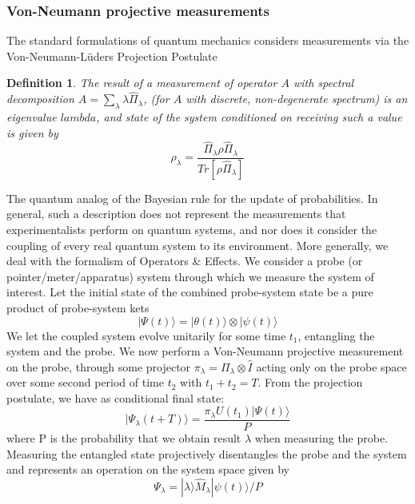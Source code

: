 \subsubsection{Von-Neumann projective measurements}
The standard formulations of quantum mechanics considers measurements via the Von-Neumann-L\"uders Projection Postulate \cite{Dirac1927}
\newtheorem{definition}{Definition}
\begin{definition}
    The result of a measurement of operator $A$ with spectral decomposition $A = \sum_\lambda \lambda \hat{\Pi}_\lambda $, (for $A$ with discrete, non-degenerate spectrum) is an eigenvalue $lambda$, and state of the system conditioned on receiving such a value is given by
    \begin{equation}
        \rho_\lambda = \frac{\hat{\Pi}_\lambda \rho \hat{\Pi}_\lambda}{Tr[\rho\hat{\Pi}_\lambda]}
    \end{equation}
\end{definition}
The quantum analog of the Bayesian rule for the update of probabilities.
In general, such a description does not represent the measurements that experimentalists perform on quantum systems, and nor does it consider the coupling of every real quantum system to its environment.
More generally, we deal with the formalism of Operators \& Effects.
We consider a probe (or pointer/meter/apparatus) system through which we measure the system of interest.
Let the initial state of the combined probe-system state be a pure product of probe-system kets
\begin{equation}
  | \Psi (t) \rangle = | \theta (t) \rangle \otimes | \psi (t) \rangle
\end{equation}
We let the coupled system evolve unitarily for some time $t_1$, entangling the system and the probe.
We now perform a Von-Neumann projective measurement on the probe, through some projector $\pi_\lambda = \Pi_\lambda \otimes \hat{I}$ acting only on the probe space over some second period of time $t_2$ with $t_1 + t_2 = T$.
From the projection postulate, we have as conditional final state:
\begin{equation}
    | \Psi_\lambda (t+T) \rangle = \frac{\pi_\lambda U(t_1) |\Psi(t)\rangle}{P}
\end{equation}
where P is the probability that we obtain result $\lambda$ when measuring the probe.
Measuring the entangled state projectively disentangles the probe and the system and represents an operation on the system space given by
\begin{equation}
\Psi_\lambda = | \lambda \rangle \hat{M}_\lambda | \psi(t) \rangle / P
\end{equation}
